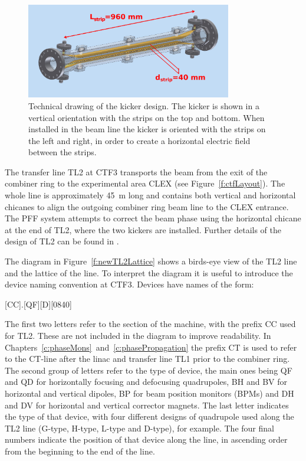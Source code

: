 \begin{figure}
  \centering
  \includegraphics[width=0.8\textwidth]{Figures/optics/kickerSchematic}
  \caption{Technical drawing of the kicker design. The kicker is shown in a vertical orientation with the strips on the top and bottom. When installed in the beam line the kicker is oriented with the strips on the left and right, in order to create a horizontal electric field between the strips.}
  \label{f:kickerSchematic}
\end{figure}


The transfer line TL2 at CTF3 transports the beam from the exit of the combiner ring to the experimental area CLEX (see Figure~\ref{f:ctfLayout}). The whole line is approximately 45~m long and contains both vertical and horizontal chicanes to align the outgoing combiner ring beam line to the CLEX entrance. The PFF system attempts to correct the beam phase using the horizontal chicane at the end of TL2, where the two kickers are installed. Further details of the design of TL2 can be found in \cite{tl2}.

The diagram in Figure~\ref{f:newTL2Lattice} shows a birds-eye view of the TL2 line and the lattice of the line. To interpret the diagram it is useful to introduce the device naming convention at CTF3. Devices have names of the form:
\begin{center}
[CC].[QF][D][0840]
\end{center}
The first two letters refer to the section of the machine, with the prefix CC used for TL2. These are not included in the diagram to improve readability. In Chapters~\ref{c:phaseMons}~and~\ref{c:phasePropagation} the prefix CT is used to refer to the CT-line after the linac and transfer line TL1 prior to the combiner ring. The second group of letters refer to the type of device, the main ones being QF and QD for horizontally focusing and defocusing quadrupoles, BH and BV for horizontal and vertical dipoles, BP for beam position monitors (BPMs) and DH and DV for horizontal and vertical corrector magnets. The last letter indicates the type of that device, with four different designs of quadrupole used along the TL2 line (G-type, H-type, L-type and D-type), for example. The four final numbers indicate the position of that device along the line, in ascending order from the beginning to the end of the line.

